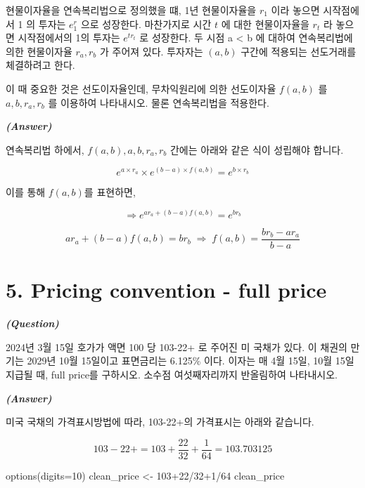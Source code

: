 \documentclass[
  a4paper,
  DIV=11,
  numbers=noendperiod]{scrreprt}
\newenvironment{Shaded}{\begin{snugshade}}{\end{snugshade}}
\newcommand{\AttributeTok}[1]{\textcolor[rgb]{0.40,0.45,0.13}{#1}}
\newcommand{\DecValTok}[1]{\textcolor[rgb]{0.68,0.00,0.00}{#1}}
\newcommand{\FunctionTok}[1]{\textcolor[rgb]{0.28,0.35,0.67}{#1}}
\newcommand{\NormalTok}[1]{\textcolor[rgb]{0.00,0.23,0.31}{#1}}
\newcommand{\OtherTok}[1]{\textcolor[rgb]{0.00,0.23,0.31}{#1}}
\newcommand{\SpecialCharTok}[1]{\textcolor[rgb]{0.37,0.37,0.37}{#1}}
\begin{document}
현물이자율을 연속복리법으로 정의했을 떄, 1년 현물이자율을 \(r_1\) 이라
놓으면 시작점에서 1 의 투자는 \(e^r_1\) 으로 성장한다. 마찬가지로 시간
\(t\) 에 대한 현물이자율을 \(r_t\) 라 놓으면 시작점에서의 1의 투자는
\(e^{tr_t}\) 로 성장한다. 두 시점 a \textless{} b 에 대하여 연속복리법에
의한 현물이자율 \(r_a, r_b\) 가 주어져 있다. 투자자는 \((a, b)\) 구간에
적용되는 선도거래를 체결하려고 한다.

이 때 중요한 것은 선도이자율인데, 무차익원리에 의한 선도이자율
\(f(a, b)\) 를 \(a, b, r_a, r_b\) 를 이용하여 나타내시오. 물론
연속복리법을 적용한다.

\textbf{\emph{(Answer)}}

연속복리법 하에서, \(f(a, b), a, b, r_a, r_b\) 간에는 아래와 같은 식이
성립해야 합니다.

\[e^{a\times r_a}\times e^{(b-a)\times f(a,b)}=e^{b\times r_b}\]

이를 통해 \(f(a,b)\)를 표현하면,

\[\Rightarrow e^{ar_a+(b-a)f(a,b)}=e^{br_b}\]

\[ar_a+(b-a)f(a,b)=br_b\;\Rightarrow\;f(a,b)=\frac{br_b-ar_a}{b-a}\]

\section*{5. Pricing convention - full
price}\label{pricing-convention---full-price}


\textbf{\emph{(Question)}}

2024년 3월 15일 호가가 액면 100 당 103-22+ 로 주어진 미 국채가 있다. 이
채권의 만기는 2029년 10월 15일이고 표면금리는 6.125\% 이다. 이자는 매
4월 15일, 10월 15일 지급될 때, full price를 구하시오. 소수점
여섯째자리까지 반올림하여 나타내시오.

\textbf{\emph{(Answer)}}

미국 국채의 가격표시방법에 따라, 103-22+의 가격표시는 아래와 같습니다.

\[103-22+=103+\frac{22}{32}+\frac{1}{64}=103.703125\]

\begin{Shaded}
\begin{Highlighting}[]
\FunctionTok{options}\NormalTok{(}\AttributeTok{digits=}\DecValTok{10}\NormalTok{)}
\NormalTok{clean\_price }\OtherTok{\textless{}{-}} \DecValTok{103}\SpecialCharTok{+}\DecValTok{22}\SpecialCharTok{/}\DecValTok{32}\SpecialCharTok{+}\DecValTok{1}\SpecialCharTok{/}\DecValTok{64}
\NormalTok{clean\_price}
\end{Highlighting}
\end{Shaded}
\end{document}
